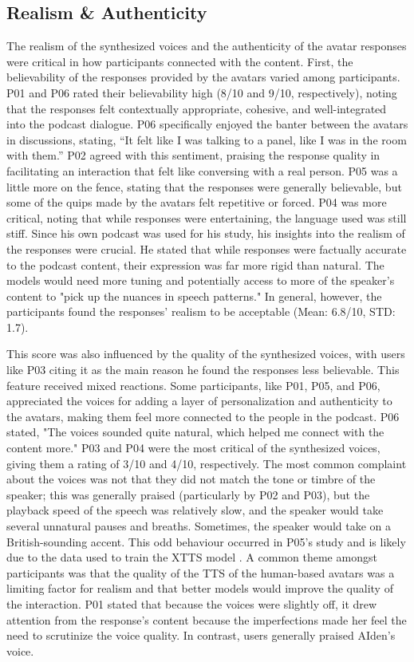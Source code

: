 \documentclass[12pt]{report}
\begin{document}
\begin{myfont}
        \subsection{Realism \& Authenticity}
        The realism of the synthesized voices and the authenticity of the avatar responses were critical in how participants connected with the content. First, the believability of the responses provided by the avatars varied among participants. P01 and P06 rated their believability high (8/10 and 9/10, respectively), noting that the responses felt contextually appropriate, cohesive, and well-integrated into the podcast dialogue. P06 specifically enjoyed the banter between the avatars in discussions, stating, “It felt like I was talking to a panel, like I was in the room with them.” P02 agreed with this sentiment, praising the response quality in facilitating an interaction that felt like conversing with a real person. P05 was a little more on the fence, stating that the responses were generally believable, but some of the quips made by the avatars felt repetitive or forced. P04 was more critical, noting that while responses were entertaining, the language used was still stiff. Since his own podcast was used for his study, his insights into the realism of the responses were crucial. He stated that while responses were factually accurate to the podcast content, their expression was far more rigid than natural. The models would need more tuning and potentially access to more of the speaker's content to "pick up the nuances in speech patterns." In general, however, the participants found the responses' realism to be acceptable (Mean: 6.8/10, STD: 1.7). 

        \indent This score was also influenced by the quality of the synthesized voices, with users like P03 citing it as the main reason he found the responses less believable. This feature received mixed reactions. Some participants, like P01, P05, and P06, appreciated the voices for adding a layer of personalization and authenticity to the avatars, making them feel more connected to the people in the podcast. P06 stated, "The voices sounded quite natural, which helped me connect with the content more." P03 and P04 were the most critical of the synthesized voices, giving them a rating of 3/10 and 4/10, respectively. The most common complaint about the voices was not that they did not match the tone or timbre of the speaker; this was generally praised (particularly by P02 and P03), but the playback speed of the speech was relatively slow, and the speaker would take several unnatural pauses and breaths. Sometimes, the speaker would take on a British-sounding accent. This odd behaviour occurred in P05's study and is likely due to the data used to train the XTTS model \citep{XTTS_Coqui}. A common theme amongst participants was that the quality of the TTS of the human-based avatars was a limiting factor for realism and that better models would improve the quality of the interaction. P01 stated that because the voices were slightly off, it drew attention from the response's content because the imperfections made her feel the need to scrutinize the voice quality. In contrast, users generally praised AIden's voice. 
        

\end{myfont}
\end{document}
